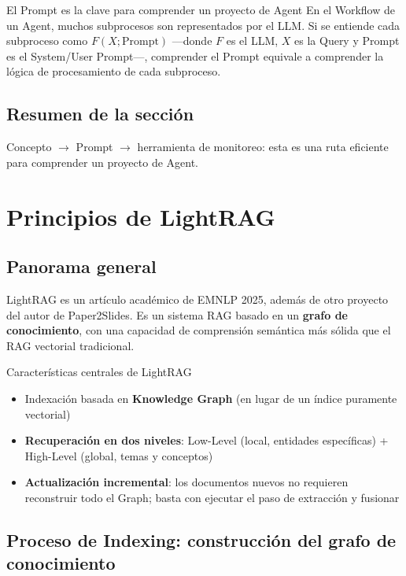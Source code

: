 \documentclass[a4paper]{article}
\begin{document}
\begin{knowledgebox}{El Prompt es la clave para comprender un proyecto de Agent}
En el Workflow de un Agent, muchos subprocesos son representados por el LLM. Si se entiende cada subproceso como $F(X; \text{Prompt})$ —donde $F$ es el LLM, $X$ es la Query y Prompt es el System/User Prompt—, comprender el Prompt equivale a comprender la lógica de procesamiento de cada subproceso.
\end{knowledgebox}

\subsection{Resumen de la sección}

Concepto $\rightarrow$ Prompt $\rightarrow$ herramienta de monitoreo: esta es una ruta eficiente para comprender un proyecto de Agent.

\section{Principios de LightRAG}

\subsection{Panorama general}

LightRAG es un artículo académico de EMNLP 2025, además de otro proyecto del autor de Paper2Slides. Es un sistema RAG basado en un \textbf{grafo de conocimiento}, con una capacidad de comprensión semántica más sólida que el RAG vectorial tradicional.

\begin{importantbox}{Características centrales de LightRAG}
\begin{itemize}
    \item Indexación basada en \textbf{Knowledge Graph} (en lugar de un índice puramente vectorial)
    \item \textbf{Recuperación en dos niveles}: Low-Level (local, entidades específicas) + High-Level (global, temas y conceptos)
    \item \textbf{Actualización incremental}: los documentos nuevos no requieren reconstruir todo el Graph; basta con ejecutar el paso de extracción y fusionar
\end{itemize}
\end{importantbox}

\subsection{Proceso de Indexing: construcción del grafo de conocimiento}
\end{document}
